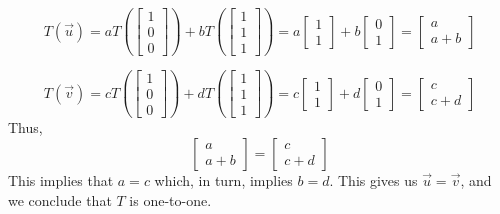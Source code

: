 \documentclass{ximera}
\begin{document}
\begin{example}
\begin{explanation}
$$T(\vec{u})=aT\left(\begin{bmatrix}1\\0\\0\end{bmatrix}\right)+bT\left(\begin{bmatrix}1\\1\\1\end{bmatrix}\right)=a\begin{bmatrix}1\\1\end{bmatrix}+b\begin{bmatrix}0\\1\end{bmatrix}=\begin{bmatrix}a\\a+b\end{bmatrix}$$

$$T(\vec{v})=cT\left(\begin{bmatrix}1\\0\\0\end{bmatrix}\right)+dT\left(\begin{bmatrix}1\\1\\1\end{bmatrix}\right)=c\begin{bmatrix}1\\1\end{bmatrix}+d\begin{bmatrix}0\\1\end{bmatrix}=\begin{bmatrix}c\\c+d\end{bmatrix}$$
Thus,
$$\begin{bmatrix}a\\a+b\end{bmatrix}=\begin{bmatrix}c\\c+d\end{bmatrix}$$
This implies that $a=c$ which, in turn, implies $b=d$.  This gives us $\vec{u}=\vec{v}$, and we conclude that $T$ is one-to-one.


\end{explanation}
\end{example}
\end{document}

